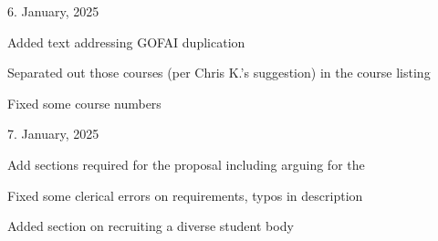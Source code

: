 
6. January, 2025

\begin{itemize*}
    \item Added text addressing GOFAI duplication
    \item Separated out those courses (per Chris K.'s suggestion) in the course listing
    \item Fixed some course numbers
\end{itemize*}

7. January, 2025

\begin{itemize*}
    \item Add sections required for the  proposal including arguing for the 
    \item Fixed some clerical errors on requirements, typos in description
    \item Added section on recruiting a diverse student body
\end{itemize*}